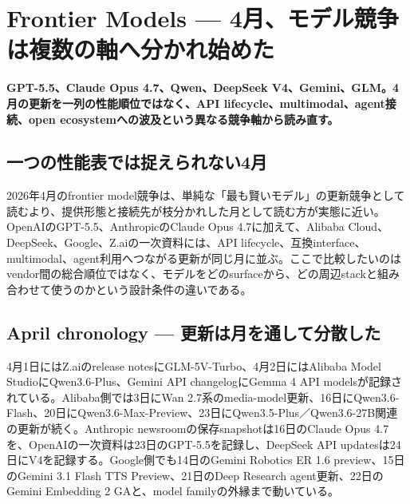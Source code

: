 \section{Frontier Models — 4月、モデル競争は複数の軸へ分かれ始めた}
\label{pkg:frontier-models-april}
\noindent\textbf{GPT-5.5、Claude Opus 4.7、Qwen、DeepSeek V4、Gemini、GLM。4月の更新を一列の性能順位ではなく、API lifecycle、multimodal、agent接続、open ecosystemへの波及という異なる競争軸から読み直す。}\autocite{src-9156c37fb1c2,src-a24fd97eb3d0,src-dfe7e0c6ff39,src-e547d0d8cbe3,src-eac8dfbeb78c,src-f6aa679babd7}

\subsection{一つの性能表では捉えられない4月}

2026年4月のfrontier model競争は、単純な「最も賢いモデル」の更新競争として読むより、提供形態と接続先が枝分かれした月として読む方が実態に近い。OpenAIのGPT-5.5、AnthropicのClaude Opus 4.7に加えて、Alibaba Cloud、DeepSeek、Google、Z.aiの一次資料には、API lifecycle、互換interface、multimodal、agent利用へつながる更新が同じ月に並ぶ。ここで比較したいのはvendor間の総合順位ではなく、モデルをどのsurfaceから、どの周辺stackと組み合わせて使うのかという設計条件の違いである。\autocite{src-9156c37fb1c2,src-a24fd97eb3d0,src-dfe7e0c6ff39,src-e547d0d8cbe3,src-eac8dfbeb78c,src-f6aa679babd7}


\subsection{April chronology — 更新は月を通して分散した}

4月1日にはZ.aiのrelease notesにGLM-5V-Turbo、4月2日にはAlibaba Model StudioにQwen3.6-Plus、Gemini API changelogにGemma 4 API modelsが記録されている。Alibaba側では3日にWan 2.7系のmedia-model更新、16日にQwen3.6-Flash、20日にQwen3.6-Max-Preview、23日にQwen3.5-Plus／Qwen3.6-27B関連の更新が続く。Anthropic newsroomの保存snapshotは16日のClaude Opus 4.7を、OpenAIの一次資料は23日のGPT-5.5を記録し、DeepSeek API updatesは24日にV4を記録する。Google側でも14日のGemini Robotics ER 1.6 preview、15日のGemini 3.1 Flash TTS Preview、21日のDeep Research agent更新、22日のGemini Embedding 2 GAと、model familyの外縁まで動いている。\autocite{src-9156c37fb1c2,src-a24fd97eb3d0,src-dfe7e0c6ff39,src-e547d0d8cbe3,src-eac8dfbeb78c,src-f6aa679babd7}


